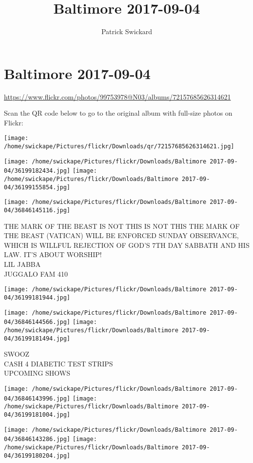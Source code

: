 \documentclass[10pt,letterpaper]{article}
\title{Baltimore 2017-09-04}
\author{Patrick Swickard}
\date{}
\begin{document}
\section*{Baltimore 2017-09-04}

\url{https://www.flickr.com/photos/99753978@N03/albums/72157685626314621}

Scan the QR code below to go to the original album with full-size photos on Flickr:

\texttt{[image: /home/swickape/Pictures/flickr/Downloads/qr/72157685626314621.jpg]}
\pagebreak

\texttt{[image: /home/swickape/Pictures/flickr/Downloads/Baltimore 2017-09-04/36199182434.jpg]}
\texttt{[image: /home/swickape/Pictures/flickr/Downloads/Baltimore 2017-09-04/36199155854.jpg]}

\vspace{0.25in}
\texttt{[image: /home/swickape/Pictures/flickr/Downloads/Baltimore 2017-09-04/36846145116.jpg]}

THE MARK OF THE BEAST IS NOT THIS IS NOT THIS THE MARK OF THE BEAST (VATICAN) WILL BE ENFORCED SUNDAY OBSERVANCE, WHICH IS WILLFUL REJECTION OF GOD'S 7TH DAY SABBATH AND HIS LAW.  IT'S ABOUT WORSHIP!\\
LIL JABBA\\
JUGGALO FAM 410
\pagebreak

\texttt{[image: /home/swickape/Pictures/flickr/Downloads/Baltimore 2017-09-04/36199181944.jpg]}

\vspace{0.25in}
\texttt{[image: /home/swickape/Pictures/flickr/Downloads/Baltimore 2017-09-04/36846144566.jpg]}
\texttt{[image: /home/swickape/Pictures/flickr/Downloads/Baltimore 2017-09-04/36199181494.jpg]}

SWOOZ\\
CASH 4 DIABETIC TEST STRIPS\\
UPCOMING SHOWS
\pagebreak

\texttt{[image: /home/swickape/Pictures/flickr/Downloads/Baltimore 2017-09-04/36846143996.jpg]}
\texttt{[image: /home/swickape/Pictures/flickr/Downloads/Baltimore 2017-09-04/36199181004.jpg]}

\texttt{[image: /home/swickape/Pictures/flickr/Downloads/Baltimore 2017-09-04/36846143286.jpg]}
\texttt{[image: /home/swickape/Pictures/flickr/Downloads/Baltimore 2017-09-04/36199180204.jpg]}
\end{document}

